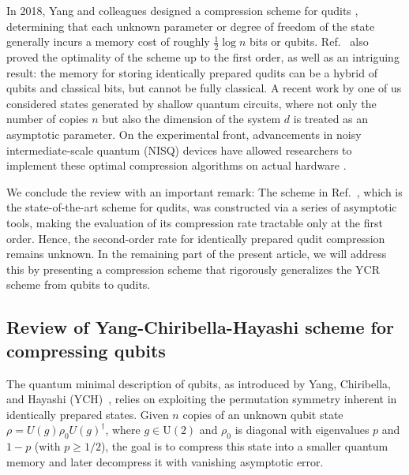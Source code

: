 \documentclass[a4paper,onecolumn,11pt]{quantumarticle}
\begin{document}
{In 2018, Yang and colleagues designed a compression scheme for qudits \cite{yang2018compression}, determining that each unknown parameter or degree of freedom of the state generally incurs a memory cost of roughly $\frac{1}{2} \log n$ bits or qubits. Ref.~\cite{yang2018compression} also proved the optimality of the scheme up to the first order, as well as an intriguing result: the memory for storing identically prepared qudits can be a hybrid of qubits and classical bits, but cannot be fully classical.
A recent work by one of us considered states generated by shallow quantum circuits, where not only the number of copies $n$ but also the dimension of the system $d$ is treated as an asymptotic parameter.
On the experimental front, advancements in noisy intermediate-scale quantum (NISQ) devices have allowed researchers to implement these optimal compression algorithms on actual hardware \cite{pivoluska2022implementation,xu2024experimental}. 

We conclude the review with an important remark: The scheme in Ref.~\cite{yang2018compression}, which is the state-of-the-art scheme for qudits, was constructed via a series of asymptotic tools, making the evaluation of its compression rate tractable only at the first order.
Hence, the second-order rate for identically prepared qudit compression remains unknown.
In the remaining part of the present article, we will address this by presenting a compression scheme that rigorously generalizes the YCR scheme from qubits to qudits.}



\subsection{Review of Yang-Chiribella-Hayashi scheme for compressing qubits}\label{sec:review}
The quantum minimal description of qubits, as introduced by Yang, Chiribella, and Hayashi (YCH)~\cite{yang2016optimal}, relies on exploiting the permutation symmetry inherent in identically prepared states. Given $n$ copies of an unknown qubit state $\rho = U(g)\rho_0 U(g)^\dagger$, where $g\in\mathrm{U}(2)$ and $\rho_0$ is diagonal with eigenvalues $p$ and $1-p$ (with $p \ge 1/2$), the goal is to compress this state into a smaller quantum memory and later decompress it with vanishing asymptotic error.
\end{document}
